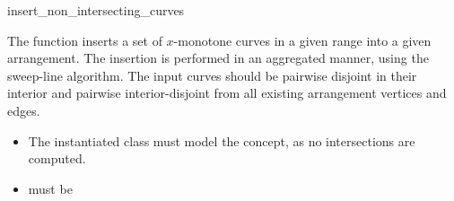 \ccRefPageBegin

\begin{ccRefFunction}{insert_non_intersecting_curves}

\ccDefinition

The function \ccRefName{} inserts a set of $x$-monotone curves in a given
range into a given arrangement. The insertion is performed in an aggregated
manner, using the sweep-line algorithm. The input curves should be pairwise
disjoint in their interior and pairwise interior-disjoint from all existing
arrangement vertices and edges. 



\ccRequirements
\begin{itemize}
\item The instantiated  class must model the
   concept, as no intersections are computed.
\item {} must be 
\end{itemize}

\end{ccRefFunction}

\ccRefPageEnd
